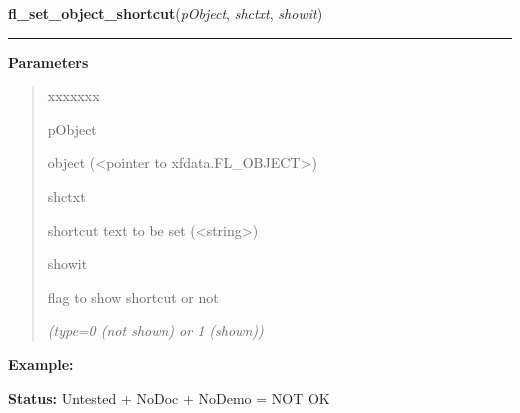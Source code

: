 \hspace{.8\funcindent}\begin{boxedminipage}{\funcwidth}

    \raggedright \textbf{fl\_set\_object\_shortcut}(\textit{pObject}, \textit{shctxt}, \textit{showit})

    \vspace{-1.5ex}

    \rule{\textwidth}{0.5\fboxrule}
\setlength{\parskip}{2ex}
\setlength{\parskip}{1ex}
      \textbf{Parameters}
      \vspace{-1ex}

      \begin{quote}
        \begin{Ventry}{xxxxxxx}

          \item[pObject]

          object ({\textless}pointer to xfdata.FL\_OBJECT{\textgreater})

          \item[shctxt]

          shortcut text to be set ({\textless}string{\textgreater})

          \item[showit]

          flag to show shortcut or not

            {\it (type=0 (not shown) or 1 (shown))}

        \end{Ventry}

      \end{quote}

\textbf{Example:} 

\textbf{Status:} Untested + NoDoc + NoDemo = NOT OK



    \end{boxedminipage}

    \label{xformslib:library:fl_set_object_shortcutkey}

    \vspace{0.5ex}

